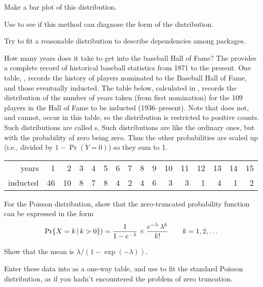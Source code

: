 \documentclass[11pt]{report}\usepackage[]{graphicx}\usepackage[]{color}
\begin{document}
\begin{Exercises}
    \begin{enumerate*}
      \item Make a bar plot of this distribution.
      \item Use  to see if this method can diagnose the form of the distribution.
      \item Try to fit a reasonable distribution to describe dependencies among \R packages.
    \end{enumerate*}

\exercise\exhard How many years does it take to get into the baseball Hall of Fame?
  The  provides a complete record of historical baseball statistics from 1871 to
  the present.  One table, , records the history of players nominated to
  the Baseball Hall of Fame, and those eventually inducted.  The table below, calculated
  in , records the distribution of the number of years
  taken (from first nomination)
  for the 109 players in the Hall of Fame to be inducted (1936--present).
  Note that  does not, and cannot, occur in this table, so the distribution
  is restricted to positive counts.  Such distributions are called s.
  Such distributions are like the ordinary ones, but with the probability of zero being zero.
  Thus the other probabilities are scaled up (i.e., divided by $1-\Pr(Y=0)$) so they sum to 1.

\begin{tabular}{r|rrrrrrrrrrrrrrr}
  \hline
years    & 1 & 2 & 3 & 4 & 5 & 6 & 7 & 8 & 9 & 10 & 11 & 12 & 13 & 14 & 15 \\
inducted &  46 &  10 &   8 &   7 &   8 &   4 &   2 &   4 &   6 &   3 &   3 &   1 &   4 &   1 &   2 \\
   \hline
\end{tabular}

    \begin{enumerate*}
      \item For the Poisson distribution, show that the zero-truncated probability function can be expressed in the
      form
\begin{equation*}
\Pr \{ X = k \, | \, k>0\} )=
  \frac{1}{1-e^{-\lambda}} \times
  \frac{ e^{ - \lambda } \:  \lambda^k } { k ! }
  \quad\quad k = 1, 2, \dots
\end{equation*}

      \item Show that the mean is $\lambda/(1-\exp(-\lambda))$.
      \item Enter these data into \R as a one-way table, and use  to fit the standard
      Poisson distribution, as if you hadn't encountered the problem of zero truncation.

    \end{enumerate*}


\end{Exercises}
\end{document}
